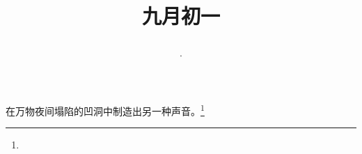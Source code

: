 \title{\date[d=3,m=10,y=2024][year:cn-y,年,month:cn,day:cn,日,·,weekday]·九月初一 }
在万物夜间塌陷的凹洞中制造出另一种声音。\footnote{ }


